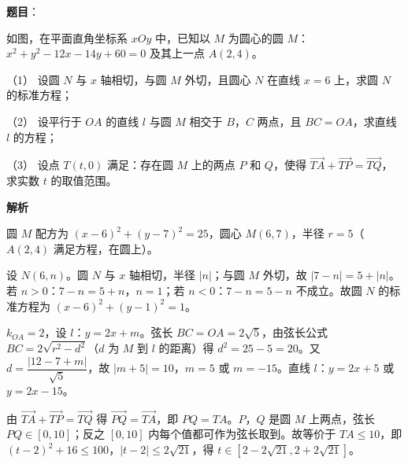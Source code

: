 \begin{answer}

\textbf{题目}：

如图，在平面直角坐标系 \(xOy\) 中，已知以 \(M\) 为圆心的圆 \(M\)：\(x^{2}+y^{2}-12x-14y+60=0\) 及其上一点 \(A(2,4)\)。

（1） 设圆 \(N\) 与 \(x\) 轴相切，与圆 \(M\) 外切，且圆心 \(N\) 在直线 \(x=6\) 上，求圆 \(N\) 的标准方程；

（2） 设平行于 \(OA\) 的直线 \(l\) 与圆 \(M\) 相交于 \(B\)，\(C\) 两点，且 \(BC=OA\)，求直线 \(l\) 的方程；

（3） 设点 \(T(t,0)\) 满足：存在圆 \(M\) 上的两点 \(P\) 和 \(Q\)，使得 \(\overrightarrow{TA}+\overrightarrow{TP}=\overrightarrow{TQ}\)，求实数 \(t\) 的取值范围。
\nopagebreak[4]
\begin{center}\end{center}
\nopagebreak[4]
\textbf{解析}

圆 \(M\) 配方为 \((x-6)^{2}+(y-7)^{2}=25\)，圆心 \(M(6,7)\)，半径 \(r=5\)（\(A(2,4)\) 满足方程，在圆上）。


设 \(N(6,n)\)。圆 \(N\) 与 \(x\) 轴相切，半径 \(|n|\)；与圆 \(M\) 外切，故 \(|7-n|=5+|n|\)。若 \(n>0\)：\(7-n=5+n\)，\(n=1\)；若 \(n<0\)：\(7-n=5-n\) 不成立。故圆 \(N\) 的标准方程为 \((x-6)^{2}+(y-1)^{2}=1\)。


\(k_{OA}=2\)，设 \(l\)：\(y=2x+m\)。弦长 \(BC=OA=2\sqrt{5}\)，由弦长公式 \(BC=2\sqrt{r^{2}-d^{2}}\)（\(d\) 为 \(M\) 到 \(l\) 的距离）得 \(d^{2}=25-5=20\)。又 \(d=\dfrac{|12-7+m|}{\sqrt{5}}\)，故 \(|m+5|=10\)，\(m=5\) 或 \(m=-15\)。直线 \(l\)：\(y=2x+5\) 或 \(y=2x-15\)。


由 \(\overrightarrow{TA}+\overrightarrow{TP}=\overrightarrow{TQ}\) 得 \(\overrightarrow{PQ}=\overrightarrow{TA}\)，即 \(PQ=TA\)。\(P\)，\(Q\) 是圆 \(M\) 上两点，弦长 \(PQ\in[0,10]\)；反之 \([0,10]\) 内每个值都可作为弦长取到。故等价于 \(TA\leqslant10\)，即 \((t-2)^{2}+16\leqslant100\)，\(|t-2|\leqslant2\sqrt{21}\)，得 \(t\in[2-2\sqrt{21},2+2\sqrt{21}]\)。




\end{answer}
